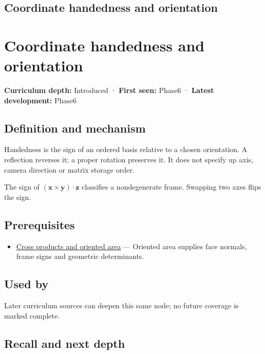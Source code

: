 \hypertarget{appendix-87d7626c8d37}{}
\section*{Coordinate handedness and orientation}
\chapter{Coordinate handedness and orientation}\label{appendix-87d7626c8d37-coordinate-handedness-and-orientation}

\textbf{Curriculum depth:} Introduced · \textbf{First seen:} Phase6 · \textbf{Latest development:} Phase6

\section{Definition and mechanism}\label{appendix-87d7626c8d37-definition-and-mechanism}

Handedness is the sign of an ordered basis relative to a chosen orientation. A reflection reverses it; a proper rotation preserves it. It does not specify up axis, camera direction or matrix storage order.

The sign of \((\mathbf x\times\mathbf y)\cdot\mathbf z\) classifies a nondegenerate frame. Swapping two axes flips the sign.

\section{Prerequisites}\label{appendix-87d7626c8d37-prerequisites}

\begin{itemize}
\tightlist
\item
  \hyperref[appendix-2391db8052b1]{Cross products and oriented area} --- Oriented area supplies face normals, frame signs and geometric determinants.
\end{itemize}

\section{Used by}\label{appendix-87d7626c8d37-used-by}

Later curriculum sources can deepen this same node; no future coverage is marked complete.

\section{Recall and next depth}\label{appendix-87d7626c8d37-recall-and-next-depth}

